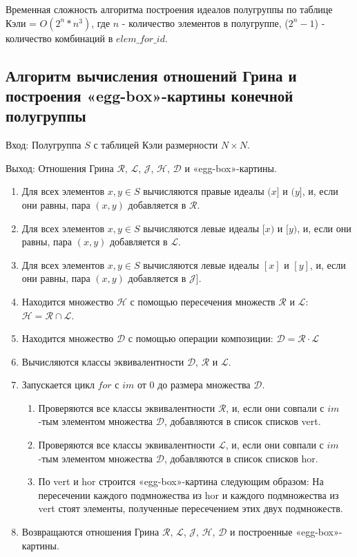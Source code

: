 \documentclass[bachelor, och, labwork]{shiza}
\newcommand{\La}{\mathcal{L}}
\newcommand{\Ra}{\mathcal{R}}
\newcommand{\Da}{\mathcal{D}}
\newcommand{\Ha}{\mathcal{H}}
\newcommand{\Ja}{\mathcal{J}}
\begin{document}
	Временная сложность алгоритма построения идеалов полугруппы по таблице Кэли = $O(2^n * n^3)$, где $n$ - количество элементов в полугруппе, ($2^n - 1$) - количество комбинаций в $elem\_for\_id$.
	
	\subsection{Алгоритм вычисления отношений Грина и построения «egg-box»-картины конечной полугруппы}
	
	$\textit{Вход:}$ Полугруппа $S$ с таблицей Кэли размерности $N \times N$.
	
	$\textit{Выход:}$  Отношения Грина $\Ra$, $\La$, $\Ja$, $\Ha$, $\Da$ и «egg-box»-картины.
	
	\begin{enumerate} 
		\item Для всех элементов $x,y \in S$ вычисляются правые идеалы $(x]$ и $(y]$, и, если они равны, пара $(x,y)$ добавляется в $\Ra$.
		
		\item Для всех элементов $x,y \in S$ вычисляются левые идеалы $[x)$ и $[y)$, и, если они равны, пара $(x,y)$ добавляется в $\La$.

		\item Для всех элементов $x,y \in S$ вычисляются левые идеалы $[x]$ и $[y]$, и, если они равны, пара $(x,y)$ добавляется в $\Ja$].

		\item Находится множество $\Ha$ с помощью пересечения множеств $\Ra$ и $\La$: $\Ha = \Ra \cap \La$.
			
		\item  Находится множество $\Da$ с помощью операции композиции: $\Da = \Ra \cdot \La$
		
		\item Вычисляются классы эквивалентности $\Da$, $\Ra$ и $\La$.
		
		\item Запускается цикл $for$ с $im$ от 0 до размера множества $\Da$. 
		
		\begin{enumerate}
			\item Проверяются все классы эквивалентности $\Ra$, и, если они совпали с $im$-тым элементом множества $\Da$, добавляются  в список списков vert.
			\item Проверяются все классы эквивалентности $\La$, и, если они совпали с $im$-тым элементом множества $\Da$, добавляются  в список списков hor.
			\item По vert и hor строится «egg-box»-картина следующим образом: На пересечении каждого подмножества из hor и каждого подмножества из vert стоят элементы, полученные пересечением этих двух подмножеств.
		\end{enumerate}
		
		\item Возвращаются отношения Грина $\Ra$, $\La$, $\Ja$, $\Ha$, $\Da$ и построенные «egg-box»-картины.
	\end{enumerate}
\end{document}
